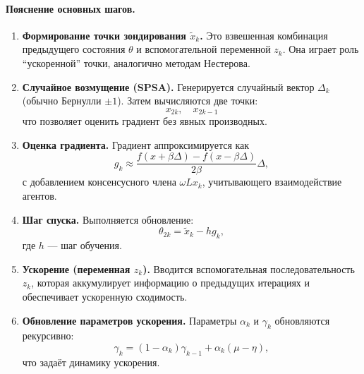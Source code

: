 \paragraph{Пояснение основных шагов.}

\begin{enumerate}
    \item \textbf{Формирование точки зондирования $\tilde{x}_k$.}  
    Это взвешенная комбинация предыдущего состояния $\theta$ и вспомогательной переменной $z_k$.  
    Она играет роль ``ускоренной'' точки, аналогично методам Нестерова.

    \item \textbf{Случайное возмущение (SPSA).}  
    Генерируется случайный вектор $\Delta_k$ (обычно Бернулли $\pm 1$).  
    Затем вычисляются две точки:
    \[
    x_{2k},\quad x_{2k-1}
    \]
    что позволяет оценить градиент без явных производных.

    \item \textbf{Оценка градиента.}  
    Градиент аппроксимируется как
    \[
    g_k \approx \frac{f(x+\beta\Delta) - f(x-\beta\Delta)}{2\beta}\Delta,
    \]
    с добавлением консенсусного члена $\omega L x_k$, учитывающего взаимодействие агентов.

    \item \textbf{Шаг спуска.}  
    Выполняется обновление:
    \[
    \theta_{2k} = \tilde{x}_k - h g_k,
    \]
    где $h$ — шаг обучения.

    \item \textbf{Ускорение (переменная $z_k$).}  
    Вводится вспомогательная последовательность $z_k$, которая аккумулирует информацию о предыдущих итерациях и обеспечивает ускоренную сходимость.

    \item \textbf{Обновление параметров ускорения.}  
    Параметры $\alpha_k$ и $\gamma_k$ обновляются рекурсивно:
    \[
    \gamma_k = (1-\alpha_k)\gamma_{k-1} + \alpha_k(\mu - \eta),
    \]
    что задаёт динамику ускорения.
\end{enumerate}